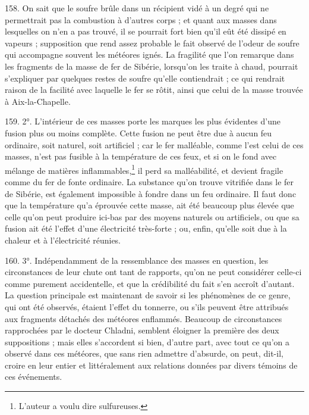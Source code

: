 \documentclass[a4paper, 11pt, oneside, polutonikogreek, french]{article}
\begin{document}
158. On sait que le soufre brûle dans un récipient vidé à un degré qui ne permettrait pas la combustion à d'autres corps ; et quant aux masses dans lesquelles on n'en a pas trouvé, il se pourrait fort bien qu'il eût été dissipé en vapeurs ; supposition que rend assez probable le fait observé de l'odeur de soufre qui accompagne souvent les météores ignés. La fragilité que l'on remarque dans les fragments de la masse de fer de Sibérie, lorsqu’on les traite à chaud, pourrait s'expliquer par quelques restes de soufre qu'elle contiendrait ; ce qui rendrait raison de la facilité avec laquelle le fer se rôtit, ainsi que celui de la masse trouvée à Aix-la-Chapelle.

159. 2°. L'intérieur de ces masses porte les marques les plus évidentes d'une fusion plus ou moins complète. Cette fusion ne peut être due à aucun feu ordinaire, soit naturel, soit artificiel ; car le fer malléable, comme l'est celui de ces masses, n'est pas fusible à la température de ces feux, et si on le fond avec mélange de matières inflammables,\footnote{L'auteur a voulu dire sulfureuses.} il perd sa malléabilité, et devient fragile comme du fer de fonte ordinaire. La substance qu'on trouve vitrifiée dans le fer de Sibérie, est également impossible à fondre dans un feu ordinaire. Il faut donc que la température qu'a éprouvée cette masse, ait été beaucoup plus élevée que celle qu'on peut produire ici-bas par des moyens naturels ou artificiels, ou que sa fusion ait été l'effet d'une électricité très-forte ; ou, enfin, qu'elle soit due à la chaleur et à l'électricité réunies.

160. 3°. Indépendamment de la ressemblance des masses en question, les circonstances de leur chute ont tant de rapports, qu'on ne peut considérer celle-ci comme purement accidentelle, et que la crédibilité du fait s'en accroît d'autant. La question principale est maintenant de savoir si les phénomènes de ce genre, qui ont été observés, étaient l'effet du tonnerre, ou s'ils peuvent être attribués aux fragments détachés des météores enflammés. Beaucoup de circonstances rapprochées par le docteur Chladni, semblent éloigner la première des deux suppositions ; mais elles s'accordent si bien, d'autre part, avec tout ce qu'on a observé dans ces météores, que sans rien admettre d'absurde, on peut, dit-il, croire en leur entier et littéralement aux relations données par divers témoins de ces événements.
\end{document}
